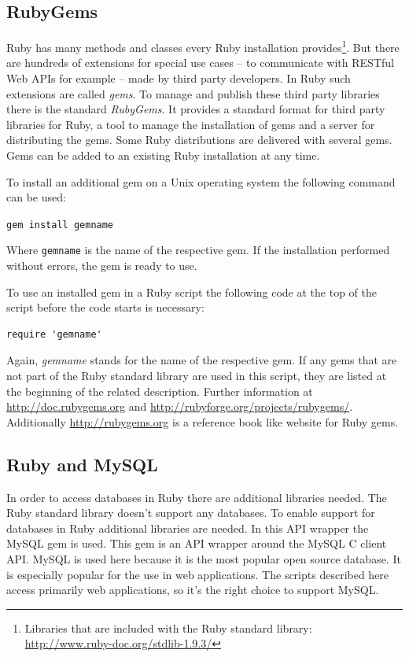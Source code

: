 \subsection{RubyGems}
Ruby has many methods and classes every Ruby installation provides\footnote{Libraries that are included with the Ruby standard library: \url{http://www.ruby-doc.org/stdlib-1.9.3/}}. But there are hundreds of extensions for special use cases – to communicate with RESTful Web APIs for example – made by third party developers. In Ruby such extensions are called \emph{gems}. To manage and publish these third party libraries there is the standard \emph{RubyGems}. It provides a standard format for third party libraries for Ruby, a tool to manage the installation of gems and a server for distributing the gems. \cite{ruby:gemdev} Some Ruby distributions are delivered with several gems. Gems can be added to an existing Ruby installation at any time. 

To install an additional gem on a Unix operating system the following command can be used:  
\begin{center}
\texttt{gem install gemname}
\end{center}
Where \texttt{gemname} is the name of the respective gem. If the installation performed without errors, the gem is ready to use. \cite{ruby:gemdoc}

To use an installed gem in a Ruby script the following code at the top of the script before the code starts is necessary:

\begin{lstlisting}[aboveskip=1\baselineskip, caption=Using the gem \emph{gemname}, label=listing001]
require 'gemname'
\end{lstlisting}
Again, \emph{gemname} stands for the name of the respective gem. If any gems that are not part of the Ruby standard library are used in this script, they are listed at the beginning of the related description. Further information at \url{http://doc.rubygems.org} and \url{http://rubyforge.org/projects/rubygems/}. Additionally \url{http://rubygems.org} is a reference book like website for Ruby gems.

\subsection{Ruby and MySQL}\label{rubymysql}
In order to access databases in Ruby there are additional libraries needed. The Ruby standard library doesn't support any databases. To enable support for databases in Ruby additional libraries are needed. In this API wrapper the MySQL gem is used. This gem is an API wrapper around the MySQL C client API. MySQL is used here because it is the most popular open source database. \cite{mysql:popularity} It is especially popular for the use in web applications. The scripts described here access primarily web applications, so it's the right choice to support MySQL.

